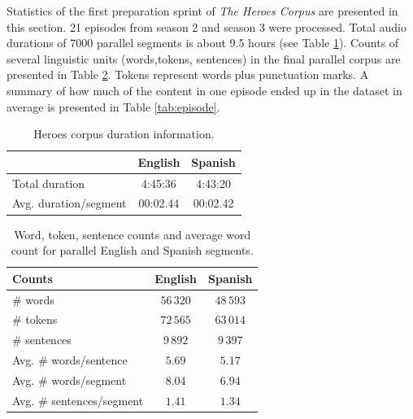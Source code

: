 Statistics of the first preparation sprint of \textit{The Heroes Corpus} are presented in this section. 21 episodes from season 2 and season 3 were processed. Total audio durations of 7000 parallel segments is about 9.5 hours (see Table \ref{tab:duration}). Counts of several linguistic units (words,tokens, sentences) in the final parallel corpus are presented in Table \ref{tab:counts}. Tokens represent words plus punctuation marks. A summary of how much of the content in one episode ended up in the dataset in average is presented in Table \ref{tab:episode}.  

\begin{table}[ht]
\centering
\begin{tabular}{lcc}
\toprule
 & \textbf{English} & \textbf{Spanish}\\ \midrule
{Total duration} &  4:45:36 & 4:43:20 \\
{Avg. duration/segment} & 00:02.44 & 00:02.42 \\\bottomrule
\end{tabular}
\caption{\label{tab:duration} Heroes corpus duration information.}
\end{table}

\vspace{5mm}

\begin{table}[ht]
\centering
\vspace{4mm}
\begin{tabular}{lcc}
\toprule
 \textbf{Counts}             & \textbf{English} & \textbf{Spanish} \\ \midrule
{\# words}                  & $56\,320$ & $48\,593$  \\
{\# tokens}                 & $72\,565$ & $63\,014$ \\
{\# sentences}              & $9\,892$  & $9\,397$ \\ 
{Avg. \# words/sentence}    & $5.69$    & $5.17$ \\ 
{Avg. \# words/segment}     & $8.04$    & $6.94$ \\ 
{Avg. \# sentences/segment} & $1.41$    & $1.34$ \\ \bottomrule
\end{tabular}
\caption{\label{tab:counts}Word, token, sentence counts and average word count for parallel English and Spanish segments.}

\end{table}



